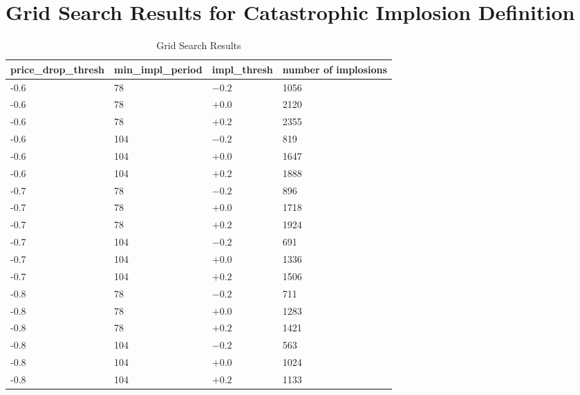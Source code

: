 \documentclass[a4paper]{report}
\begin{document}
\section*{Grid Search Results for Catastrophic Implosion Definition}
\begin{table}[htbp]
  \centering
  \small
  \caption{Grid Search Results}
  \label{tab:data_description}
  \begin{tabularx}{\textwidth}{|p{3cm}|p{3cm}|p{3cm}|p{4cm}|}
  \hline
  \textbf{price\_drop\_thresh} & \textbf{min\_impl\_period} & \textbf{impl\_thresh}  & \textbf{number of implosions} \\ 
  \hline
  -0.6 & 78  & \(-0.2\) & 1056 \\
  -0.6 & 78  & \(+0.0\) & 2120 \\
  -0.6 & 78  & \(+0.2\) & 2355 \\
  -0.6 & 104 & \(-0.2\) & 819 \\
  -0.6 & 104 & \(+0.0\) & 1647 \\
  -0.6 & 104 & \(+0.2\) & 1888 \\
  -0.7 & 78  & \(-0.2\) & 896 \\
  -0.7 & 78  & \(+0.0\) & 1718 \\
  -0.7 & 78  & \(+0.2\) & 1924 \\
  -0.7 & 104 & \(-0.2\) & 691 \\
  -0.7 & 104 & \(+0.0\) & 1336 \\
  -0.7 & 104 & \(+0.2\) & 1506 \\
  -0.8 & 78  & \(-0.2\) & 711 \\
  -0.8 & 78  & \(+0.0\) & 1283 \\
  -0.8 & 78  & \(+0.2\) & 1421 \\
  -0.8 & 104 & \(-0.2\) & 563 \\
  -0.8 & 104 & \(+0.0\) & 1024 \\
  -0.8 & 104 & \(+0.2\) & 1133 \\ 
  \hline
  \end{tabularx}
\end{table}





\end{document}
